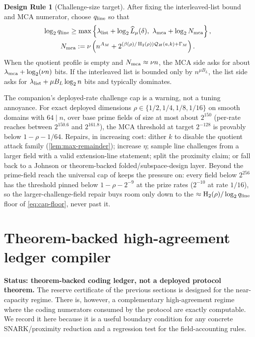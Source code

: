 \documentclass[11pt]{article}
\theoremstyle{definition}
\newtheorem{designrule}[theorem]{Design Rule}
\newcommand{\Hbin}{\operatorname{H}_2}
\newcommand{\Qprof}{\mathcal Q}
\newcommand{\qline}{q_{\rm line}}
\begin{document}
\begin{designrule}[Challenge-size target]
\label{rule:qchal}
After fixing the interleaved-list bound and MCA numerator, choose $\qline$ so that
\begin{gather*}
        \log_2\qline
        \ge
        \max\left\{
        \lambda_{\rm list}+\log_2\widehat L_{\mu}(\delta),\
        \lambda_{\rm mca}+\log_2 N_{\rm mca}
        \right\},\\
        N_{\rm mca}:=\nu\left(n^{A_M}
        +2^{(\beta(\rho)/\Hbin(\rho))\Qprof_H(a,k)+\Gamma_M}\right).
\end{gather*}
When the quotient profile is empty and $N_{\rm mca}\approx\nu n$, the MCA side asks for about $\lambda_{\rm mca}+\log_2(\nu n)$ bits.  If the interleaved list is bounded only by $n^{\mu B_L}$, the list side asks for $\lambda_{\rm list}+\mu B_L\log_2n$ bits and typically dominates.
\end{designrule}

The companion's deployed-rate challenge cap \cite[Prop.~19.7]{SlackMCAEntropyMerged} is a warning, not a tuning annoyance.  For exact deployed dimensions $\rho\in\{1/2,1/4,1/8,1/16\}$ on smooth domains with $64\mid n$, over base prime fields of size at most about $2^{150}$ (per-rate reaches between $2^{150.6}$ and $2^{161.8}$), the MCA threshold at target $2^{-128}$ is provably below $1-\rho-1/64$.  Repairs, in increasing cost: dither $k$ to disable the quotient attack family (\cref{lem:max-remainder}); increase $\eta$; sample line challenges from a larger field with a valid extension-line statement; split the proximity claim; or fall back to a Johnson or theorem-backed folded/subspace-design layer.  Beyond the prime-field reach the universal cap of \cite{UniversalCap} keeps the pressure on: every field below $2^{256}$ has the threshold pinned below $1-\rho-2^{-9}$ at the prize rates ($2^{-10}$ at rate $1/16$), so the larger-challenge-field repair buys room only down to the $\approx\Hbin(\rho)/\log_2\qline$ floor of \eqref{eq:cap-floor}, never past it.


\section{Theorem-backed high-agreement ledger compiler}\label{sec:high-agreement-ledger-compiler}

\textbf{Status: theorem-backed coding ledger, not a deployed protocol theorem.}
The reserve certificate of the previous sections is designed for the
near-capacity regime.  There is, however, a complementary high-agreement regime
where the coding numerators consumed by the protocol are exactly computable.  We
record it here because it is a useful boundary condition for any concrete
SNARK/proximity reduction and a regression test for the field-accounting rules.
\end{document}
